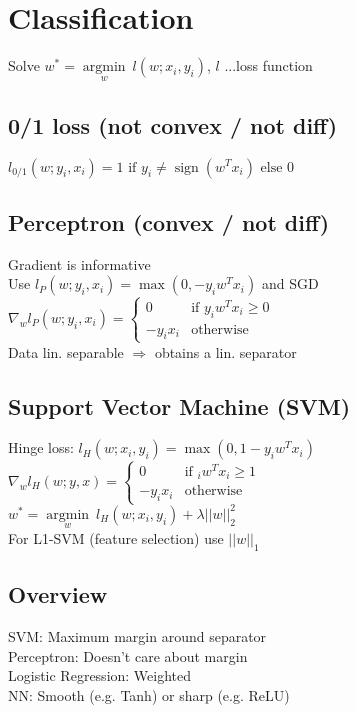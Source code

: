 \section*{Classification}

Solve $w^* = \underset{w}{\operatorname{argmin}} ~ l(w;x_i,y_i)$, $l$ ...loss function

\subsection*{0/1 loss (not convex / not diff)}
$l_{0/1} (w;y_i,x_i) = 1 \text{ if } y_i \neq \operatorname{sign}(w^Tx_i) \text{ else } 0$

\subsection*{Perceptron (convex / not diff)}
Gradient is informative\\
Use $l_P (w;y_i,x_i) = \operatorname{max}(0, -y_i w^T x_i)$ and SGD\\
$\nabla_w l_P(w;y_i,x_i) = 
\begin{cases}
    0 &\text{if } y_i w^T x_i \geq 0\\
    -y_i x_i &\text{otherwise}
\end{cases}$ \\
Data lin. separable $\Rightarrow$ obtains a lin. separator

\subsection*{Support Vector Machine (SVM)}
Hinge loss: $l_H(w;x_i,y_i) = \operatorname{max}(0,1-y_i w^T x_i)$ \\
$\nabla_w l_H(w;y,x) = 
\begin{cases}
    0 &\text{if } _i w^T x_i \geq 1\\
    -y_i x_i &\text{otherwise}
\end{cases}$\\
$w^* = \underset{w}{\operatorname{argmin}} ~ l_H(w;x_i,y_i) + \lambda||w||_2^2$\\ For L1-SVM (feature selection) use $||w||_1$ 

\subsection*{Overview}
SVM: Maximum margin around separator\\
Perceptron: Doesn't care about margin\\
Logistic Regression: Weighted\\
NN: Smooth (e.g. Tanh) or sharp (e.g. ReLU)